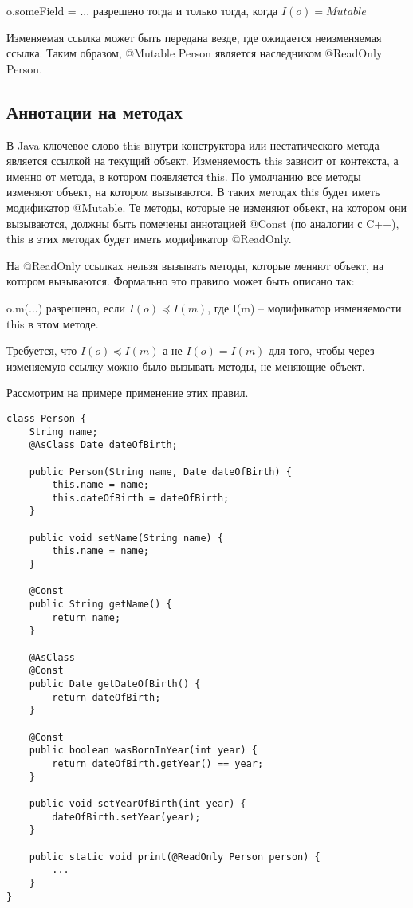 \begin{Rule}\label{rule:assign_field}
o.someField = ... разрешено тогда и только тогда, когда $I(o) = Mutable$ 
\end{Rule}

Изменяемая ссылка может быть передана везде, где ожидается неизменяемая ссылка. Таким образом, @Mutable Person является наследником @ReadOnly Person.

\subsection{Аннотации на методах}

В Java ключевое слово this внутри конструктора или нестатического метода является ссылкой на текущий объект.  Изменяемость this зависит от контекста, а именно от метода, в котором появляется this. По умолчанию все методы изменяют объект, на котором вызываются. В таких методах this будет иметь модификатор @Mutable. Те методы, которые не изменяют объект, на котором они вызываются, должны быть помечены аннотацией @Const (по аналогии с C++), this в этих методах будет иметь модификатор @ReadOnly.

На @ReadOnly ссылках нельзя вызывать методы, которые меняют объект, на котором вызываются. Формально это правило может быть описано так:

\begin{Rule}\label{rule:invoke_method}
o.m(...) разрешено, если $I(o) \preceq I(m)$, где I(m) -- модификатор изменяемости this в этом методе.
\end{Rule}

Требуется, что $I(o) \preceq I(m)$ а не $I(o) = I(m)$ для того, чтобы через изменяемую ссылку можно было вызывать методы, не меняющие объект. 

Рассмотрим на примере применение этих правил.

\begin{lstlisting}[caption=Аннотации на методах, label=code:method_annotations]
class Person {
    String name;
    @AsClass Date dateOfBirth;	
    
    public Person(String name, Date dateOfBirth) {
    	this.name = name;
    	this.dateOfBirth = dateOfBirth;
    }
    
    public void setName(String name) {
        this.name = name;
    }
    
    @Const
    public String getName() {
        return name;
    }
    
    @AsClass
    @Const
    public Date getDateOfBirth() {
        return dateOfBirth;
    }
    
    @Const 
    public boolean wasBornInYear(int year) {
    	return dateOfBirth.getYear() == year;
    }
    
    public void setYearOfBirth(int year) {
        dateOfBirth.setYear(year);
    }
    
    public static void print(@ReadOnly Person person) {
        ...
    }
}
\end{lstlisting} 

